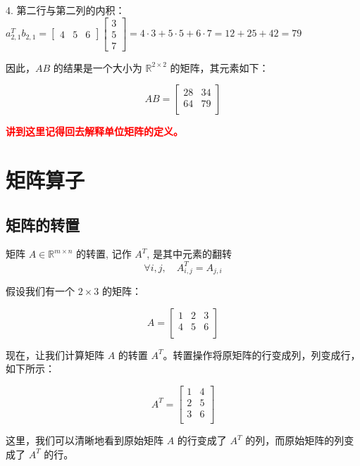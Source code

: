 \documentclass[lang=cn,newtx,10pt,scheme=chinese]{elegantbook}
\begin{document}
\begin{exercise}
4. 第二行与第二列的内积： $a_{2,1}^T b_{2,1} = \begin{bmatrix} 4 & 5 & 6 \end{bmatrix} \begin{bmatrix} 3 \\ 5 \\ 7 \end{bmatrix} = 4 \cdot 3 + 5 \cdot 5 + 6 \cdot 7 = 12 + 25 + 42 = 79$

因此，$AB$ 的结果是一个大小为 $\mathbb{R}^{2 \times 2}$ 的矩阵，其元素如下：

\[
AB = \begin{bmatrix}
28 & 34 \\
64 & 79 \\
\end{bmatrix}
\]

\end{exercise}

\textcolor{red}{\bf 讲到这里记得回去解释单位矩阵的定义。}


\section{矩阵算子}

\subsection{矩阵的转置}

\begin{definition}
    
矩阵 $A \in \mathbb{R}^{m \times n}$ 的转置, 记作 $A^T$, 是其中元素的翻转
$$
\forall i, j, \quad A_{i, j}^T=A_{j, i}
$$
\end{definition}

\begin{exercise}
    假设我们有一个 $2 \times 3$ 的矩阵：

$$
A = \begin{bmatrix}
1 & 2 & 3 \\
4 & 5 & 6 \\
\end{bmatrix}
$$

现在，让我们计算矩阵 $A$ 的转置 $A^T$。转置操作将原矩阵的行变成列，列变成行，如下所示：

$$
A^T = \begin{bmatrix}
1 & 4 \\
2 & 5 \\
3 & 6 \\
\end{bmatrix}
$$

这里，我们可以清晰地看到原始矩阵 $A$ 的行变成了 $A^T$ 的列，而原始矩阵的列变成了 $A^T$ 的行。

\end{exercise}
\end{document}
